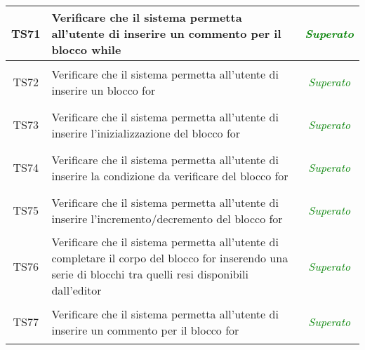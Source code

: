 \begin{longtable}{|c|>{}m{8cm}|c|}
\hypertarget{TS4.4.3}{TS71} & Verificare che il sistema permetta all'utente di inserire un commento per il blocco while & \textcolor{Green}{\textit{Superato}}\\ \hline
\hypertarget{TS4.5}{TS72} & Verificare che il sistema permetta all'utente di inserire un blocco for & \textcolor{Green}{\textit{Superato}}\\ \hline
\hypertarget{TS4.5.1}{TS73} & Verificare che il sistema permetta all'utente di inserire l'inizializzazione del blocco for & \textcolor{Green}{\textit{Superato}}\\ \hline
\hypertarget{TS4.5.2}{TS74} & Verificare che il sistema permetta all'utente di inserire la condizione da verificare del blocco for & \textcolor{Green}{\textit{Superato}}\\ \hline
\hypertarget{TS4.5.3}{TS75} & Verificare che il sistema permetta all'utente di inserire l'incremento/decremento del blocco for & \textcolor{Green}{\textit{Superato}}\\ \hline
\hypertarget{TS4.5.4}{TS76} & Verificare che il sistema permetta all'utente di completare il corpo del blocco for inserendo una serie di blocchi tra quelli resi disponibili dall'editor & \textcolor{Green}{\textit{Superato}}\\ \hline
\hypertarget{TS4.5.5}{TS77} & Verificare che il sistema permetta all'utente di inserire un commento per il blocco for & \textcolor{Green}{\textit{Superato}}\\ \hline



\end{longtable}
